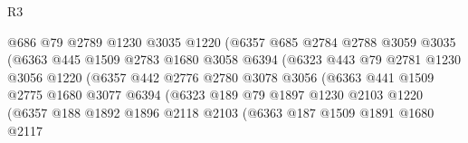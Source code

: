 \begin{lexlean}{R3}
\begin{coremodule}
                                @686
                                @79
                                @2789
                                @1230
                                @3035
                                @1220
                                (@6357
                                  @685
                                  @2784
                                  @2788
                                  @3059
                                  @3035
                                  (@6363
                                    @445
                                    @1509
                                    @2783
                                    @1680
                                    @3058
                                    @6394
                                    (@6323
                                      @443
                                      @79
                                      @2781
                                      @1230
                                      @3056
                                      @1220
                                      (@6357
                                        @442
                                        @2776
                                        @2780
                                        @3078
                                        @3056
                                        (@6363
                                          @441
                                          @1509
                                          @2775
                                          @1680
                                          @3077
                                          @6394
                                          (@6323
                                            @189
                                            @79
                                            @1897
                                            @1230
                                            @2103
                                            @1220
                                            (@6357
                                              @188
                                              @1892
                                              @1896
                                              @2118
                                              @2103
                                              (@6363
                                                @187
                                                @1509
                                                @1891
                                                @1680
                                                @2117

\end{coremodule}
\end{lexlean}
